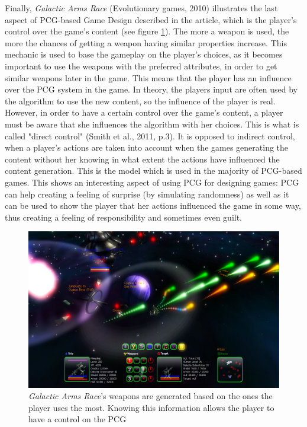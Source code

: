 Finally, \textit{Galactic Arms Race} (Evolutionary games, 2010)\cite{game:gar} illustrates the last aspect of PCG-based Game Design described in the article, which is the player's control over the game's content (see figure \ref{fig:GAR}). The more a weapon is used, the more the chances of getting a weapon having similar properties increase. This mechanic is used to base the gameplay on the player's choices, as it becomes important to use the weapons with the preferred attributes, in order to get similar weapons later in the game. This means that the player has an influence over the PCG system in the game. In theory, the players input are often used by the algorithm to use the new content, so the influence of the player is real. However, in order to have a certain control over the game's content, a player must be aware that she influences the algorithm with her choices. This is what is called "direct control" (Smith et al., 2011, p.3). It is opposed to indirect control, when a player's actions are taken into account when the games generating the content without her knowing in what extent the actions have influenced the content generation. This is the model which is used in the majority of PCG-based games. This shows an interesting aspect of using PCG for designing games: PCG can help creating a feeling of surprise (by simulating randomness) as well as it can be used to show the player that her actions influenced the game in some way, thus creating a feeling of responsibility and sometimes even guilt.

\begin{figure}[!ht]
    \centering
    \includegraphics[scale=0.2]{Images/GAR.jpg}
    \caption{\textit{Galactic Arms Race}'s weapons are generated based on the ones the player uses the most. Knowing this information allows the player to have a control on the PCG}
    \label{fig:GAR}
\end{figure}

